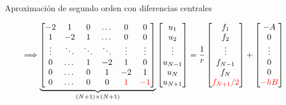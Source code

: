 \documentclass{beamer}
\begin{document}
\begin{frame}{Aproximación de segundo orden con diferencias centrales}
\begin{footnotesize}
		\[
		\Longrightarrow
		\underbrace{
			\left[
			\begin{matrix}
			-2 & 1 & 0  & \dots & 0 & 0  \\
			1 & -2 & 1  & \dots & 0 & 0 \\
			\vdots & \ddots & \ddots & \ddots & \vdots & \vdots \\
			0 & \dots & 1 & -2 & 1 & 0 \\
			0 & \dots & 0 & 1 & -2 & 1 \\
			0 & \dots & 0 & 0 & \textcolor{red}{1} & \textcolor{red}{-1}        
			\end{matrix}
			\right] 
		}_{(N+1) \times (N+1)}
		\left[
		\begin{matrix}
		u_1 \\ u_2 \\ \vdots \\ u_{N-1} \\ u_N \\ u_{N+1}
		\end{matrix}
		\right]= 
		\frac{1}{r} \left[
		\begin{matrix}
		f_1 \\ f_2 \\ \vdots \\ f_{N-1} \\ f_N \\ \textcolor{red}{f_{N+1}/2}
		\end{matrix}
		\right] +
		\left[
		\begin{matrix}
		-A \\ 0 \\  \vdots \\ 0 \\ 0 \\ \textcolor{red}{-hB}
		\end{matrix}
		\right]
		\]
		
	\end{footnotesize}
	
\end{frame}
\end{document}

